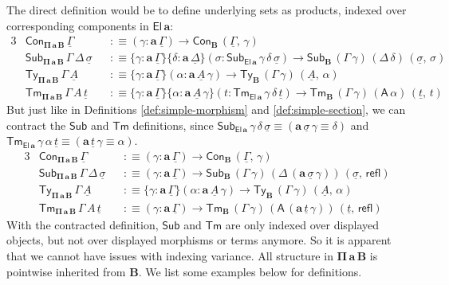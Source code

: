 \documentclass[12pt,a4paper,twoside,openany]{book}
\theoremstyle{remark}
\theoremstyle{definition}
\theoremstyle{theorem}
\newcommand{\bs}[1]{\boldsymbol{#1}}
\newcommand{\refl}{\mathsf{refl}}
\newcommand{\Con}{\mathsf{Con}}
\newcommand{\Sub}{\mathsf{Sub}}
\newcommand{\Tm}{\mathsf{Tm}}
\newcommand{\Ty}{\mathsf{Ty}}
\newcommand{\El}{\mathsf{El}}
\newcommand{\A}{\mathsf{A}}
\newcommand{\ba}{\bs{a}}
\newcommand{\bB}{\bs{B}}
\newcommand{\ul}[1]{\underline{#1}}
\newcommand{\ulGamma}{\ul{\Gamma}}
\newcommand{\ulDelta}{\ul{\Delta}}
\newcommand{\ulsigma}{\ul{\sigma}}
\newcommand{\ult}{\ul{t}}
\newcommand{\ulA}{\ul{A}}
\newcommand{\defn}{:\equiv}
\begin{document}
The direct definition would be to define underlying sets as products, indexed
over corresponding components in $\bs{\El\,a}$:
\begin{alignat*}{3}
  & \Con_{\bs{\Pi\,a\,B}}\,\ulGamma &&\defn (\gamma : \ba\,\ulGamma) \to \Con_{\bB}\,(\ulGamma,\,\gamma)\\
  & \Sub_{\bs{\Pi\,a\,B}}\,\Gamma\,\Delta\,\ulsigma &&\defn
    \{\gamma : \ba\,\ulGamma\}\{\delta : \ba\,\ulDelta\}(\sigma : \Sub_{\bs{\El\,a}}\,\gamma\,\delta\,\ulsigma) \to \Sub_{\bB}\,(\Gamma\,\gamma)\,(\Delta\,\delta)\,(\ulsigma,\,\sigma)\\
  & \Ty_{\bs{\Pi\,a\,B}}\,\Gamma\,\ulA &&\defn
    \{\gamma : \ba\,\ulGamma\}(\alpha : \ba\,\ulA\,\gamma) \to \Ty_{\bB}\,(\Gamma\,\gamma)\,(\ulA,\,\alpha)\\
  & \Tm_{\bs{\Pi\,a\,B}}\,\Gamma\,A\,\ult &&\defn
    \{\gamma : \ba\,\ulGamma\}\{\alpha : \ba\,\ulA\,\gamma\}(t : \Tm_{\bs{\El\,a}}\,\gamma\,\delta\,\ult)
      \to
    \Tm_{\bB}\,(\Gamma\,\gamma)\,(\A\,\alpha)\,(\ult,\,t)
\end{alignat*}
But just like in Definitions \ref{def:simple-morphism} and
\ref{def:simple-section}, we can contract the $\Sub$ and $\Tm$ definitions,
since $\Sub_{\bs{\El\,a}}\,\gamma\,\delta\,\ulsigma \equiv
(\ba\,\ulsigma\,\gamma \equiv \delta)$ and
$\Tm_{\bs{\El\,a}}\,\gamma\,\alpha\,\ult \equiv (\ba\,\ult\,\gamma \equiv
\alpha)$.
\begin{alignat*}{3}
  & \Con_{\bs{\Pi\,a\,B}}\,\ulGamma &&\defn (\gamma : \ba\,\ulGamma) \to \Con_{\bB}\,(\ulGamma,\,\gamma)\\
  & \Sub_{\bs{\Pi\,a\,B}}\,\Gamma\,\Delta\,\ulsigma &&\defn
    (\gamma : \ba\,\ulGamma)\to \Sub_{\bB}\,(\Gamma\,\gamma)\,(\Delta\,(\ba\,\ulsigma\,\gamma))\,(\ulsigma,\,\refl)\\
  & \Ty_{\bs{\Pi\,a\,B}}\,\Gamma\,\ulA &&\defn
  \{\gamma : \ba\,\ulGamma\}(\alpha : \ba\,\ulA\,\gamma)
  \to \Ty_{\bB}\,(\Gamma\,\gamma)\,(\ulA,\,\alpha)\\
  & \Tm_{\bs{\Pi\,a\,B}}\,\Gamma\,A\,\ult &&\defn
    (\gamma : \ba\,\ulGamma) \to \Tm_{\bB}\,(\Gamma\,\gamma)\,(\A\,(\ba\,\ult\,\gamma))\,(\ult,\,\refl)
\end{alignat*}
With the contracted definition, $\Sub$ and $\Tm$ are only indexed over displayed
objects, but not over displayed morphisms or terms anymore. So it is apparent
that we cannot have issues with indexing variance. All structure in
$\bs{\Pi\,a\,B}$ is pointwise inherited from $\bB$. We list some examples below
for definitions.
\end{document}
